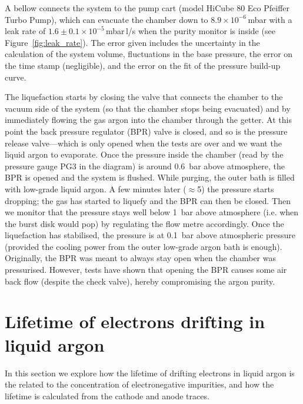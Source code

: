 \documentclass[a4paper,11pt]{article}
\begin{document}
A bellow connects the system to the pump cart (model HiCube 80 Eco Pfeiffer Turbo Pump), which can evacuate the chamber down to $8.9\times10^{-6}$\,mbar with a leak rate of $1.6\pm0.1\times10^{-5}$\,mbar\,l/s when the purity monitor is inside (see Figure~\ref{fig:leak_rate}). The error given includes the uncertainty in the calculation of the system volume, fluctuations in the base pressure, the error on the time stamp (negligible), and the error on the fit of the pressure build-up curve.

The liquefaction starts by closing the valve that connects the chamber to the vacuum side of the system (so that the chamber stops being evacuated) and by immediately flowing the gas argon into the chamber through the getter. At this point the back pressure regulator (BPR) valve is closed, and so is the pressure release valve---which is only opened when the tests are over and we want the liquid argon to evaporate. Once the pressure inside the chamber (read by the pressure gauge PG3 in the diagram) is around \SI{0.6}{bar} above atmosphere, the BPR is opened and the system is flushed. While purging, the outer bath is filled with low-grade liquid argon. A few minutes later ($\approx$5) the pressure starts dropping; the gas has started to liquefy and the BPR can then be closed. Then we monitor that the pressure stays well below \SI{1}{bar} above atmosphere (i.e. when the burst disk would pop) by regulating the flow metre accordingly. Once the liquefaction has stabilised, the pressure is at \SI{0.1}{bar} above atmospheric pressure (provided the cooling power from the outer low-grade argon bath is enough). Originally, the BPR was meant to always stay open when the chamber was pressurised. However, tests have shown that opening the BPR causes some air back flow (despite the check valve), hereby compromising the argon purity.

\section{Lifetime of electrons drifting in liquid argon}
\label{sec:calculation_lifetime}
In this section we explore how the lifetime of drifting electrons in liquid argon is the related to the concentration of electronegative impurities, and how the lifetime is calculated from the cathode and anode traces.

\end{document}
